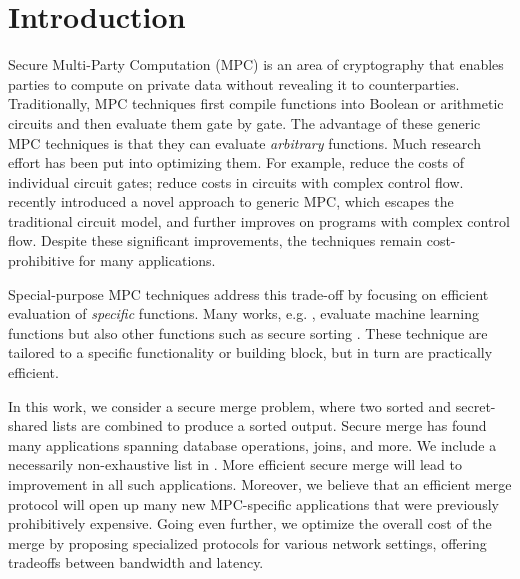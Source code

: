 \section{Introduction}\label{sec:intro}

Secure Multi-Party Computation (MPC) is an area of cryptography that enables parties to compute on private data without revealing it to counterparties.
Traditionally, MPC techniques first compile functions into Boolean or arithmetic circuits and then evaluate them gate by gate. 
The advantage of these generic MPC techniques is that they can evaluate \emph{arbitrary} functions.
Much research effort has been put into optimizing them.
For example,  \cite{ICALP:KolSch08,EC:ZahRosEva15}  reduce the costs of individual circuit gates; \cite{AC:HeaKolPec20,PKC:HeaKolPec21} reduce costs in circuits with complex control flow.
\cite{CCS:YPHK23} recently introduced a novel approach to generic MPC, which escapes the traditional circuit model, and further improves on programs with complex control flow.
Despite these significant improvements, the techniques remain cost-prohibitive for many applications.

Special-purpose MPC techniques address this trade-off by focusing on efficient evaluation of \emph{specific} functions.
Many works, e.g. \cite{FC:BCGJPP18,EUROSP:APRSS24}, evaluate machine learning functions but also other functions such as secure sorting \cite{pinkasSort}. 
These technique are tailored to a specific functionality or building block, but in turn are practically efficient.

In this work, we consider a secure merge problem, where two sorted and secret-shared lists are combined to produce a sorted output. Secure merge has found many applications spanning database operations, joins, and more. We include a necessarily non-exhaustive list in . More efficient secure merge will lead to improvement in all such applications. Moreover, we believe that an efficient merge protocol will open up many new MPC-specific applications that were previously prohibitively expensive.
Going even further,  we optimize the overall cost of the merge by proposing specialized protocols for various network settings, offering tradeoffs between bandwidth and latency.


